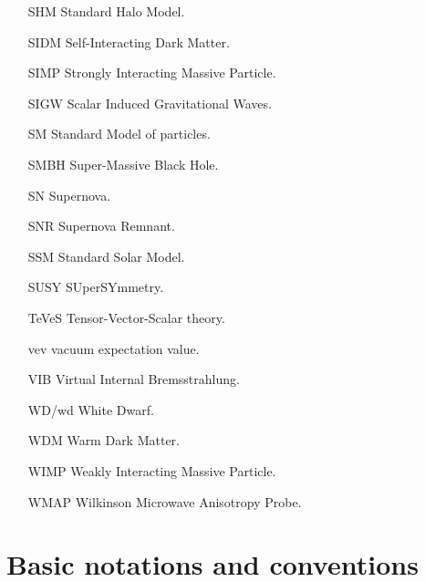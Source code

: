 \begin{multicols}{2}
\begin{itemize}
\item[SHM] Standard Halo Model.
\item[SIDM] Self-Interacting Dark Matter.
\item[SIMP] Strongly Interacting Massive Particle.
\item[SIGW] Scalar Induced Gravitational Waves.
\item[SM] Standard Model of particles.
\item[SMBH] Super-Massive Black Hole.
\item[SN] Supernova.
\item[SNR] Supernova Remnant.
\item[SSM] Standard Solar Model.
\item[SUSY] SUperSYmmetry.
\item[TeVeS] Tensor-Vector-Scalar theory.
\item[vev] vacuum expectation value.
\item[VIB] Virtual Internal Bremsstrahlung.
\item[WD/wd] White Dwarf.
\item[WDM] Warm Dark Matter.
\item[WIMP] Weakly Interacting Massive Particle.
\item[WMAP] Wilkinson Microwave Anisotropy Probe.
\end{itemize}
\end{multicols}

\def\baselinestretch{1}


\chapter{Basic notations and conventions}\label{Conventions}

